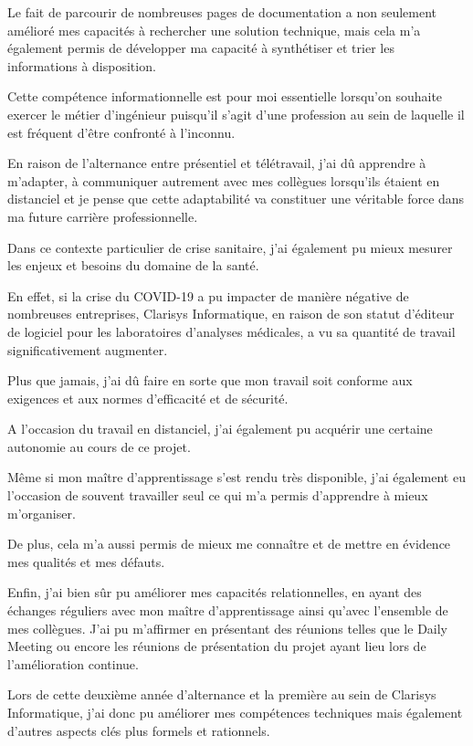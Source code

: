 Le fait de parcourir de nombreuses pages de documentation a non seulement amélioré mes capacités à rechercher une solution technique, mais cela m’a également permis de développer ma capacité à synthétiser et trier les informations à disposition.

Cette compétence informationnelle est pour moi essentielle lorsqu’on souhaite exercer le métier d’ingénieur puisqu’il s’agit d’une profession au sein de laquelle il est fréquent d’être confronté à l’inconnu.

En raison de l’alternance entre présentiel et télétravail, j’ai dû apprendre à m’adapter, à communiquer autrement avec mes collègues lorsqu’ils étaient en distanciel et je pense que cette adaptabilité va constituer une véritable force dans ma future carrière professionnelle.

Dans ce contexte particulier de crise sanitaire, j’ai également pu mieux mesurer les enjeux et besoins du domaine de la santé. 

En effet, si la crise du COVID-19 a pu impacter de manière négative de nombreuses entreprises, Clarisys Informatique, en raison de son statut d’éditeur de logiciel pour les laboratoires d’analyses médicales, a vu sa quantité de travail significativement augmenter. 

Plus que jamais, j’ai dû faire en sorte que mon travail soit conforme aux exigences et aux normes d’efficacité et de sécurité. 

A l’occasion du travail en distanciel, j’ai également pu acquérir une certaine autonomie au cours de ce projet. 

Même si mon maître d’apprentissage s’est rendu très disponible, j’ai également eu l’occasion de souvent travailler seul ce qui m’a permis d’apprendre à mieux m’organiser.

De plus, cela m’a aussi permis de mieux me connaître et de mettre en évidence mes qualités et mes défauts.

Enfin, j’ai bien sûr pu améliorer mes capacités relationnelles, en ayant des échanges réguliers avec mon maître d’apprentissage ainsi qu’avec l’ensemble de mes collègues. J’ai pu m’affirmer en présentant des réunions telles que le Daily Meeting ou encore les réunions de présentation du projet ayant lieu lors de l’amélioration continue. 

Lors de cette deuxième année d’alternance et la première au sein de Clarisys Informatique, j’ai donc pu améliorer mes compétences techniques mais également d’autres aspects clés plus formels et rationnels.
\pagebreak